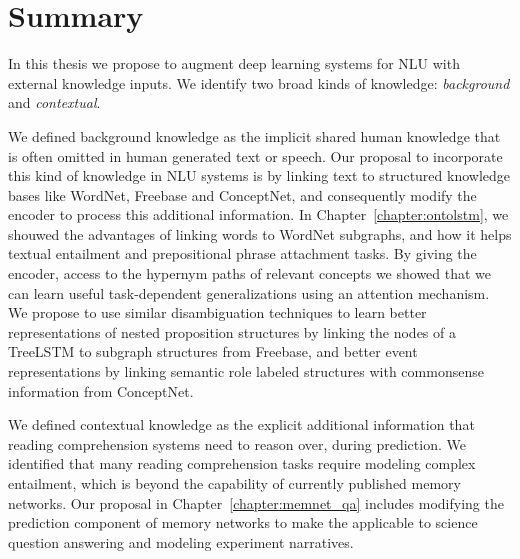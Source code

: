 % 


\section{Summary}
In this thesis we propose to augment deep learning systems for NLU with external knowledge inputs. We identify two broad kinds of knowledge: \textit{background} and \textit{contextual}.

We defined background knowledge as the implicit shared human knowledge that is often omitted in human generated text or speech. Our proposal to incorporate this kind of knowledge in NLU systems is by linking text to structured knowledge bases like
WordNet, Freebase and ConceptNet, and consequently modify the encoder to process this additional information. In Chapter~\ref{chapter:ontolstm}, we shouwed the advantages of linking words to WordNet subgraphs, and how it helps textual entailment and 
prepositional phrase attachment tasks. By giving the encoder, access to the hypernym paths of relevant concepts we showed that we can learn useful task-dependent generalizations using an attention mechanism. We propose to use similar disambiguation
techniques to learn better representations of nested proposition structures by linking the nodes of a TreeLSTM to subgraph structures from Freebase, and better event representations by linking semantic role labeled structures with commonsense information from ConceptNet.

We defined contextual knowledge as the explicit additional information that reading comprehension systems need to reason over, during prediction. We identified that many reading comprehension tasks require modeling complex entailment,
which is beyond the capability of currently published memory networks. Our proposal in Chapter~\ref{chapter:memnet_qa} includes modifying the prediction component of memory networks to make the applicable to science question answering and modeling experiment narratives.

